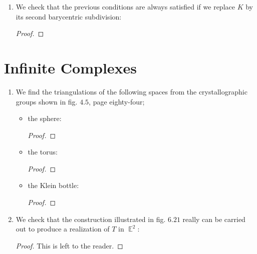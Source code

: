 \documentclass{book}
\DeclareMathOperator*{\E}{\mathbb{E}}
\begin{document}
\begin{enumerate}[(1)]
    \item We check that the previous conditions are always satisfied if we replace $K$ by its second barycentric subdivision: 
        \begin{proof}
        \end{proof}
\end{enumerate}

\section{Infinite Complexes}
\begin{enumerate}[(1)]
    \item We find the triangulations of the following spaces from the crystallographic groups shown in fig. $4.5$, page eighty-four;  
        \begin{itemize}
            \item the sphere: 
                \begin{proof} 
                \end{proof}

            \item the torus: 
                \begin{proof}
                \end{proof}

            \item the Klein bottle: 
                \begin{proof}
                \end{proof}
        \end{itemize}

    \item We check that the construction illustrated in fig. $6.21$ really can be carried out to produce a realization of $T$ in $\E^2$: 
        \begin{proof} This is left to the reader. 
        \end{proof}


\end{enumerate}
\end{document}
